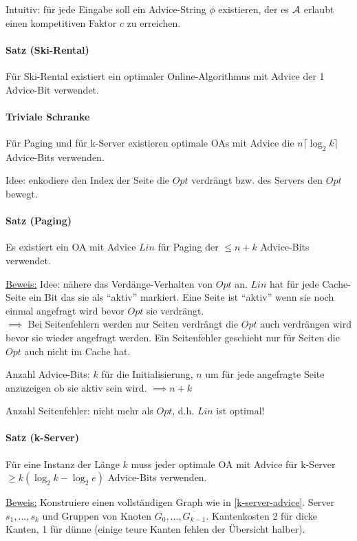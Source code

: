 Intuitiv: für jede Eingabe soll ein Advice-String $\phi$ existieren, der es $\mathcal{A}$ erlaubt
einen kompetitiven Faktor $c$ zu erreichen.

\paragraph{Satz (Ski-Rental)}
Für Ski-Rental existiert ein optimaler Online-Algorithmus mit Advice der 1 Advice-Bit verwendet.

\paragraph{Triviale Schranke}
Für Paging und für k-Server existieren optimale OAs mit Advice die $n \lceil \log_2 k \rceil $
Advice-Bits verwenden.

Idee: enkodiere den Index der Seite die $Opt$ verdrängt bzw. des Servers den $Opt$ bewegt.

\paragraph{Satz (Paging)}
Es existiert ein OA mit Advice $Lin$ für Paging der $\leq n + k$ Advice-Bits verwendet.

\underline{Beweis:}
Idee: nähere das Verdänge-Verhalten von $Opt$ an.
$Lin$ hat für jede Cache-Seite ein Bit das sie als ``aktiv'' markiert.
Eine Seite ist ``aktiv'' wenn sie noch einmal angefragt wird bevor $Opt$ sie verdrängt.
\\
$\implies$ Bei Seitenfehlern werden nur Seiten verdrängt die $Opt$ auch verdrängen wird bevor sie
wieder angefragt werden.
Ein Seitenfehler geschieht nur für Seiten die $Opt$ auch nicht im Cache hat.

Anzahl Advice-Bits: $k$ für die Initialisierung, $n$ um für jede angefragte Seite anzuzeigen ob sie
aktiv sein wird. $\implies n + k$

Anzahl Seitenfehler: nicht mehr als $Opt$, d.h. $Lin$ ist optimal!

\paragraph{Satz (k-Server)}
Für eine Instanz der Länge $k$ muss jeder optimale OA mit Advice für k-Server
$\geq k (\log_2 k - \log_2 e)$ Advice-Bits verwenden.

\underline{Beweis:}
Konstruiere einen vollständigen Graph wie in \autoref{k-server-advice}.
Server $s_1, ..., s_k$ und Gruppen von Knoten $\overline{G_0}, ..., \overline{G_{k-1}} $.
Kantenkosten 2 für dicke Kanten, 1 für dünne (einige teure Kanten fehlen der Übersicht halber).

